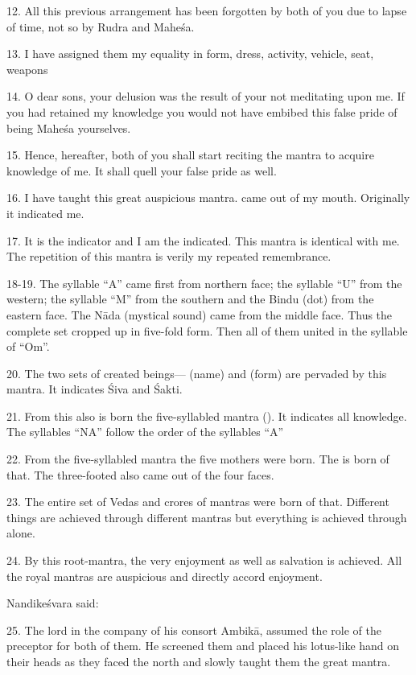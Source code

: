 12. All this previous arrangement has been forgotten by both of you due to lapse
of time, not so by Rudra and Maheśa.

13. I have assigned them my equality in form, dress, activity, vehicle, seat,
weapons \etc

14. O dear sons, your delusion was the result of your not meditating upon me. If
you had retained my knowledge you would not have embibed this false pride of
being Maheśa yourselves.

15. Hence, hereafter, both of you shall start reciting the mantra  to
acquire knowledge of me. It shall quell your false pride as well.

16. I have taught this great auspicious mantra.  came out of my mouth.
Originally it indicated me.

17. It is the indicator and I am the indicated. This mantra is identical with me.
The repetition of this mantra is verily my repeated remembrance.

18-19. The syllable “A” came first from northern face; the syllable “U” from
the western; the syllable “M” from the southern and the Bindu (dot) from
the eastern face. The Nāda (mystical sound) came from the middle face. Thus
the complete set cropped up in five-fold form. Then all of them united in
the syllable of “Om”.

20. The two sets of created beings— (name) and  (form) are
pervaded by this mantra. It indicates Śiva and Śakti.

21. From this also is born the five-syllabled mantra (). It
indicates all knowledge. The syllables “NA” \etc follow the order of
the syllables “A” \etc

22. From the five-syllabled mantra the five mothers were born.
The  is born of that. The three-footed  also came out
of the four faces.

23. The entire set of Vedas and crores of mantras were born of that. Different
things are achieved through different mantras but everything is achieved through
 alone.

24. By this root-mantra, the very enjoyment as well as salvation is achieved.
All the royal mantras are auspicious and directly accord enjoyment.

Nandikeśvara said:

25. The lord in the company of his consort Ambikā, assumed the role of
the preceptor for both of them. He screened them and placed his lotus-like hand
on their heads as they faced the north and slowly taught them the great mantra.

